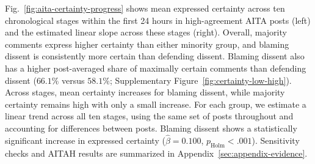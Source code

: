 

\label{subsec:res-certainty-contrasts}
Fig.~\ref{fig:aita-certainty-progress} shows mean expressed certainty
across ten chronological stages within the first 24 hours in high-agreement
AITA posts (left) and the estimated linear slope across these stages
(right). Overall, majority comments express higher certainty than either
minority group, and blaming dissent is consistently more certain than
defending dissent.
Blaming dissent also has a higher post-averaged share of maximally
certain comments than defending dissent ($66.1\%$ versus $58.1\%$;
Supplementary Figure~\ref{fig:certainty-low-high}).
Across stages, mean certainty increases for blaming dissent, while
majority certainty remains high with only a small increase. 
For each group, we estimate a linear trend across all ten stages,
using the same set of posts throughout and accounting for differences
between posts. Blaming dissent shows a statistically significant
increase in expressed certainty ($\hat{\beta}=0.100$,
$p_{\mathrm{Holm}}<.001$).
Sensitivity checks and AITAH results are summarized in
Appendix~\ref{sec:appendix-evidence}.


